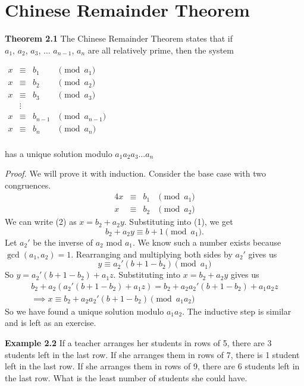 \documentclass{article}
\begin{document}
\section{Chinese Remainder Theorem}
\begin{mdframed}
    \textbf{Theorem 2.1} The Chinese Remainder Theorem states that if \\$a_1$, $a_2$, $a_3$, $\dots$ $a_{n-1}$, $a_n$ are all relatively prime, then the system
    \begin{center}
        $\begin{array}{rcll}
             x &\equiv &b_1 &\pmod{a_1}\\
             x &\equiv &b_2 &\pmod{a_2}\\
             x &\equiv &b_3 &\pmod{a_3}\\
               &\vdots & &\\
            x &\equiv &b_{n-1} &\pmod{a_{n-1}}\\

             x &\equiv &b_n &\pmod{a_n}\\
        \end{array}$
    \end{center}
    has a unique solution modulo $a_1 a_2 a_3 \dots a_n$
\end{mdframed}
\emph{Proof.} We will prove it with induction. Consider the base case with two congruences. 
\begin{alignat}{4}
         x &\equiv &b_1 &\pmod{a_1}\\
        x &\equiv &b_{2} &\pmod{a_{2}}
\end{alignat}
We can write (2) as $x = b_2 + a_2y$. Substituting into (1), we get $$b_2 + a_2y \equiv b+1 \pmod{a_1}.$$
Let $a_2'$ be the inverse of $a_2$ mod $a_1$. We know such a number exists because $\gcd(a_1,a_2)=1$. 
Rearranging and multiplying both sides by $a_2'$ gives us $$y \equiv a_2'(b+1-b_2) \pmod{a_1}$$
So $y = a_2'(b+1-b_2) + a_1z$. Substituting into $x = b_2 + a_2y$ gives us 
\begin{align*}
    b_2 + a_2(a_2'(b+1-b_2)+a_1z)=b_2+a_2a_2'(b+1-b_2)+a_1a_2z\\
    \implies x \equiv b_2+a_2a_2'(b+1-b_2) \pmod{a_1a_2}
\end{align*}
So we have found a unique solution modulo $a_1a_2$. The inductive step is similar and is left as an exercise.
\begin{mdframed}
    \textbf{Example 2.2} 
    If a teacher arranges her students in rows of 5, there are 3 students left in the last row.
    If she arranges them in rows of 7, there is 1 student left in the last row. If she arranges them in rows of 9, 
    there are 6 students left in the last row. What is the least number of students she could have.
\end{mdframed}
\end{document}
